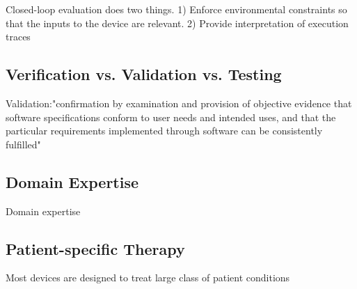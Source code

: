 Closed-loop evaluation does two things. 1) Enforce environmental constraints so that the inputs to the device are relevant. 2) Provide interpretation of execution traces 

\subsection{Verification vs. Validation vs. Testing}

Validation:"confirmation by examination and provision of objective evidence that software specifications conform to user needs and intended uses, and that the particular requirements implemented through software can be consistently fulfilled"\cite{ISO8402,fda2}
\subsection{Domain Expertise}
Domain expertise 
\subsection{Patient-specific Therapy}
Most devices are designed to treat large class of patient conditions
